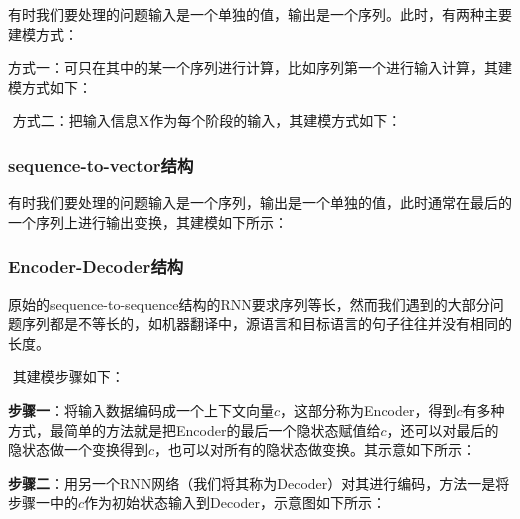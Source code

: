 ​
有时我们要处理的问题输入是一个单独的值，输出是一个序列。此时，有两种主要建模方式：

​
方式一：可只在其中的某一个序列进行计算，比如序列第一个进行输入计算，其建模方式如下：


​ 方式二：把输入信息X作为每个阶段的输入，其建模方式如下：


\subsubsection{sequence-to-vector结构}\label{sequence-to-vectorux7ed3ux6784}

​
有时我们要处理的问题输入是一个序列，输出是一个单独的值，此时通常在最后的一个序列上进行输出变换，其建模如下所示：


\subsubsection{Encoder-Decoder结构}\label{encoder-decoderux7ed3ux6784}

​
原始的sequence-to-sequence结构的RNN要求序列等长，然而我们遇到的大部分问题序列都是不等长的，如机器翻译中，源语言和目标语言的句子往往并没有相同的长度。

​ 其建模步骤如下：

​
\textbf{步骤一}：将输入数据编码成一个上下文向量\(c\)，这部分称为Encoder，得到\(c\)有多种方式，最简单的方法就是把Encoder的最后一个隐状态赋值给\(c\)，还可以对最后的隐状态做一个变换得到\(c\)，也可以对所有的隐状态做变换。其示意如下所示：


​
\textbf{步骤二}：用另一个RNN网络（我们将其称为Decoder）对其进行编码，方法一是将步骤一中的\(c​\)作为初始状态输入到Decoder，示意图如下所示：

